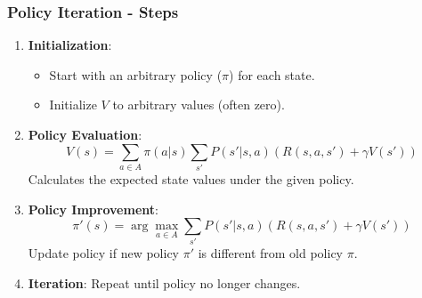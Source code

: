 \documentclass[aspectratio=169]{beamer}
\begin{document}
\begin{frame}[fragile]
    \frametitle{Policy Iteration - Steps}
    \begin{enumerate}
        \item \textbf{Initialization}:
            \begin{itemize}
                \item Start with an arbitrary policy ($\pi$) for each state.
                \item Initialize $V$ to arbitrary values (often zero).
            \end{itemize}
            
        \item \textbf{Policy Evaluation}:
            \begin{equation}
                V(s) = \sum_{a \in A} \pi(a|s) \sum_{s'} P(s'|s,a) \left( R(s,a,s') + \gamma V(s') \right)
            \end{equation}
            Calculates the expected state values under the given policy.

        \item \textbf{Policy Improvement}:
            \begin{equation}
                \pi'(s) = \arg\max_{a \in A} \sum_{s'} P(s'|s,a) \left( R(s,a,s') + \gamma V(s') \right)
            \end{equation}
            Update policy if new policy $\pi'$ is different from old policy $\pi$.

        \item \textbf{Iteration}:
            Repeat until policy no longer changes.
    \end{enumerate}
\end{frame}
\end{document}
